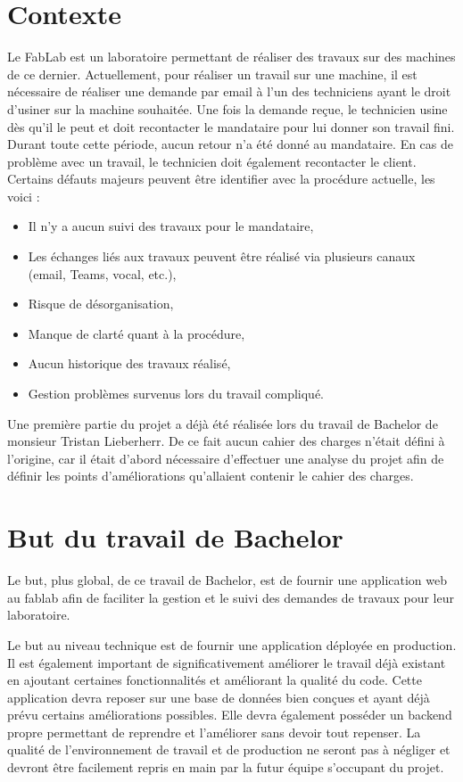 \documentclass[
    iai, %
    il, %
]{heig-tb}
\begin{document}
\section{Contexte}
Le FabLab est un laboratoire permettant de réaliser des travaux sur des machines de ce dernier. Actuellement, pour réaliser un travail sur une machine, il est nécessaire de réaliser une demande par email à l'un des techniciens ayant le droit d'usiner sur la machine souhaitée. Une fois la demande reçue, le technicien usine dès qu'il le peut et doit recontacter le mandataire pour lui donner son travail fini. Durant toute cette période, aucun retour n'a été donné au mandataire. En cas de problème avec un travail, le technicien doit également recontacter le client.\newline
Certains défauts majeurs peuvent être identifier avec la procédure actuelle, les voici :
\begin{itemize}
    \item Il n'y a aucun suivi des travaux pour le mandataire, \cite{lieberherr}
    \item Les échanges liés aux travaux peuvent être réalisé via plusieurs canaux (email, Teams, vocal, etc.), \cite{lieberherr}
    \item Risque de désorganisation, \cite{lieberherr}
    \item Manque de clarté quant à la procédure, \cite{lieberherr}
    \item Aucun historique des travaux réalisé,
    \item Gestion problèmes survenus lors du travail compliqué.
\end{itemize}
Une première partie du projet a déjà été réalisée lors du travail de Bachelor de monsieur Tristan Lieberherr. De ce fait aucun cahier des charges n'était défini à l'origine, car il était d'abord nécessaire d'effectuer une analyse du projet afin de définir les points d'améliorations qu'allaient contenir le cahier des charges.

\section{But du travail de Bachelor}
Le but, plus global, de ce travail de Bachelor, est de fournir une application web au fablab afin de faciliter la gestion et le suivi des demandes de travaux pour leur laboratoire.

Le but au niveau technique est de fournir une application déployée en production.\newline
Il est également important de significativement améliorer le travail déjà existant en ajoutant certaines fonctionnalités et améliorant la qualité du code.\newline
Cette application devra reposer sur une base de données bien conçues et ayant déjà prévu certains améliorations possibles. Elle devra également posséder un backend propre permettant de reprendre et l'améliorer sans devoir tout repenser.\newline
La qualité de l'environnement de travail et de production ne seront pas à négliger et devront être facilement repris en main par la futur équipe s'occupant du projet.
\end{document}
